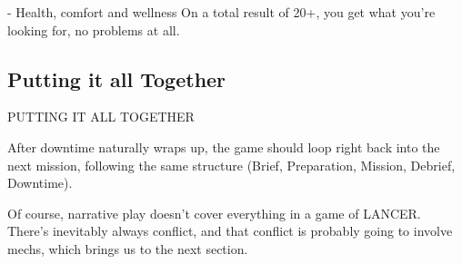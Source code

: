      -   Health, comfort and wellness
On a total result of 20+, you get what you’re looking for, no problems at all.

\subsection{Putting it all Together}
                                    PUTTING IT ALL TOGETHER

After downtime naturally wraps up, the game should loop right back into the next mission,
following the same structure (Brief, Preparation, Mission, Debrief, Downtime).

Of course, narrative play doesn’t cover everything in a game of LANCER. There’s inevitably
always conflict, and that conflict is probably going to involve mechs, which brings us to the next
section.


